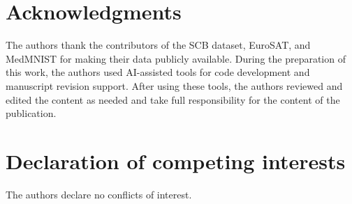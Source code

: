 \documentclass[11pt,a4paper]{article}
\begin{document}
\section*{Acknowledgments}
The authors thank the contributors of the SCB dataset, EuroSAT, and MedMNIST for making their data publicly available. During the preparation of this work, the authors used AI-assisted tools for code development and manuscript revision support. After using these tools, the authors reviewed and edited the content as needed and take full responsibility for the content of the publication.

\section*{Declaration of competing interests}
The authors declare no conflicts of interest.




\end{document}
